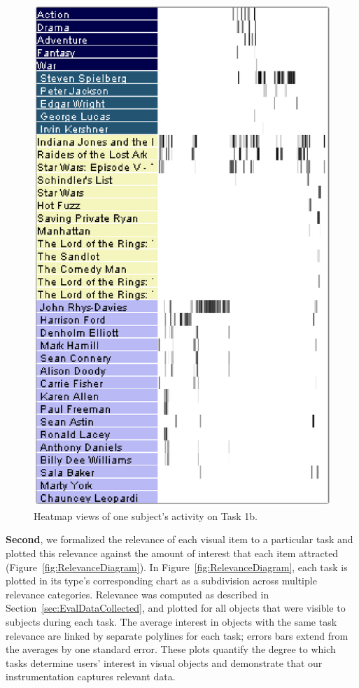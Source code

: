 \begin{figure}[!ht]
  \centering
  \includegraphics[width=0.75\linewidth]{images/heatmaps.eps}
  \caption{Heatmap views of one subject's activity on Task 1b.}
	\label{fig:heatmap}
\end{figure}

\vspace{2mm}\noindent
\textbf{Second}, we formalized the relevance of each visual item to a particular task and plotted this relevance against the amount of interest that each item attracted (Figure~\ref{fig:RelevanceDiagram}). In Figure~\ref{fig:RelevanceDiagram}, each task is plotted in its type's corresponding chart as a subdivision across multiple relevance categories. Relevance was computed as described in Section~\ref{sec:EvalDataCollected}, and plotted for all objects that were visible to subjects during each task. The average interest in objects with the same task relevance are linked by separate polylines for each task; errors bars extend from the averages by one standard error. These plots quantify the degree to which tasks determine users' interest in visual objects and demonstrate that our instrumentation captures relevant data.    

